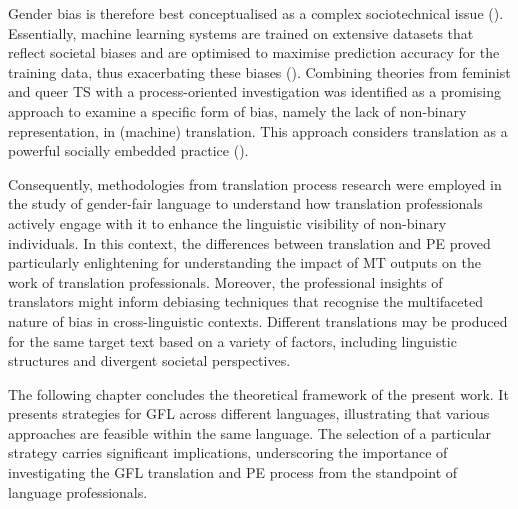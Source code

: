 Gender bias is therefore best conceptualised as a complex sociotechnical issue (\cite{savoldi2021gender}). Essentially, machine learning systems are trained on extensive datasets that reflect societal biases and are optimised to maximise prediction accuracy for the training data, thus exacerbating these biases (\cite{zou2018ai}). Combining theories from feminist and queer TS with a process-oriented investigation was identified as a promising approach to examine a specific form of bias, namely the lack of non-binary representation, in (machine) translation. This approach considers translation as a powerful socially embedded practice (\cite{wolf2007sociology}).

Consequently, methodologies from translation process research were employed in the study of gender-fair language to understand how translation professionals actively engage with it to enhance the linguistic visibility of non-binary individuals. In this context, the differences between translation and PE proved particularly enlightening for understanding the impact of MT outputs on the work of translation professionals. Moreover, the professional insights of translators might inform debiasing techniques that recognise the multifaceted nature of bias in cross-linguistic contexts. Different translations may be produced for the same target text based on a variety of factors, including linguistic structures and divergent societal perspectives.

The following chapter concludes the theoretical framework of the present work. It presents strategies for GFL across different languages, illustrating that various approaches are feasible within the same language. The selection of a particular strategy carries significant implications, underscoring the importance of investigating the GFL translation and PE process from the standpoint of language professionals.










